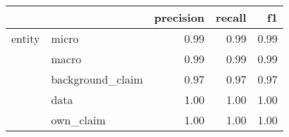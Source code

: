 \begin{tabular}{llrrr}
\toprule
       &           &  precision &  recall &   f1 \\
\midrule
entity & micro &       0.99 &    0.99 & 0.99 \\
       & macro &       0.99 &    0.99 & 0.99 \\
       & background\_claim &       0.97 &    0.97 & 0.97 \\
       & data &       1.00 &    1.00 & 1.00 \\
       & own\_claim &       1.00 &    1.00 & 1.00 \\
\bottomrule
\end{tabular}
